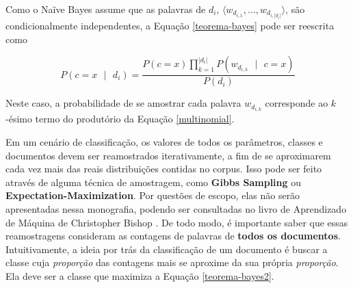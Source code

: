 
Como o Naïve Bayes assume que as palavras de \ensuremath{d_i}, \ensuremath{\langle w_{d_{i,1}}, ..., w_{d_{i,|d_i|}} \rangle}, são condicionalmente independentes, a Equação \ref{teorema-bayes} pode ser reescrita como \cite{naive-forty}

\begin{equation}
\label{teorema-bayes2}
\ensuremath{P(c = x\mbox{ }|\mbox{ }d_i) = \frac{P(c = x)\prod_{k = 1}^{|d_i|}P(w_{d_{i,k}}\mbox{ }|\mbox{ }c = x)}{P(d_i)}}
\end{equation}

Neste caso, a probabilidade de se amostrar cada palavra \ensuremath{w_{d_{i,k}}} corresponde ao \ensuremath{k}-ésimo termo do produtório da Equação \ref{multinomial}.


Em um cenário de classificação, os valores de todos os parâmetros, classes e documentos devem ser reamostrados iterativamente, a fim de se aproximarem cada vez mais das reais distribuições contidas no corpus. Isso pode ser feito através de alguma técnica de amostragem, como \textbf{Gibbs Sampling} ou \textbf{Expectation-Maximization}. Por questões de escopo, elas não serão apresentadas nessa monografia, podendo ser consultadas no livro de Aprendizado de Máquina de Christopher Bishop \cite{bishop}. De todo modo, é importante saber que essas reamostragens consideram as contagens de palavras de \textbf{todos os documentos}. Intuitivamente, a ideia por trás da classificação de um documento é buscar a classe cuja \emph{proporção} das contagens mais se aproxime da sua própria \emph{proporção}. Ela deve ser a classe que maximiza a Equação \ref{teorema-bayes2}.%


